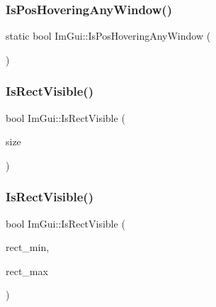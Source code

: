\subsubsection{\texorpdfstring{Is\+Pos\+Hovering\+Any\+Window()}{IsPosHoveringAnyWindow()}}
{\footnotesize\ttfamily static bool Im\+Gui\+::\+Is\+Pos\+Hovering\+Any\+Window (\begin{DoxyParamCaption}\item[{const \hyperlink{struct_im_vec2}{Im\+Vec2} \&}]{ }\end{DoxyParamCaption})\hspace{0.3cm}{\ttfamily [static]}}

\hypertarget{namespace_im_gui_a578ead6237b3ed05497ed361f18d9f97}{}\label{namespace_im_gui_a578ead6237b3ed05497ed361f18d9f97} 
\subsubsection{\texorpdfstring{Is\+Rect\+Visible()}{IsRectVisible()}\hspace{0.1cm}{\footnotesize\ttfamily [1/2]}}
{\footnotesize\ttfamily bool Im\+Gui\+::\+Is\+Rect\+Visible (\begin{DoxyParamCaption}\item[{const \hyperlink{struct_im_vec2}{Im\+Vec2} \&}]{size }\end{DoxyParamCaption})}

\hypertarget{namespace_im_gui_a5aca7e6939e07caaca489aa8c776fd81}{}\label{namespace_im_gui_a5aca7e6939e07caaca489aa8c776fd81} 
\subsubsection{\texorpdfstring{Is\+Rect\+Visible()}{IsRectVisible()}\hspace{0.1cm}{\footnotesize\ttfamily [2/2]}}
{\footnotesize\ttfamily bool Im\+Gui\+::\+Is\+Rect\+Visible (\begin{DoxyParamCaption}\item[{const \hyperlink{struct_im_vec2}{Im\+Vec2} \&}]{rect\+\_\+min,  }\item[{const \hyperlink{struct_im_vec2}{Im\+Vec2} \&}]{rect\+\_\+max }\end{DoxyParamCaption})}

\hypertarget{namespace_im_gui_aa3fc41b9cef756f5bcdd837cc013c85c}{}\label{namespace_im_gui_aa3fc41b9cef756f5bcdd837cc013c85c} 
